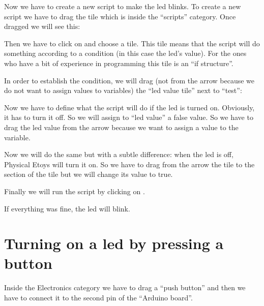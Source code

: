 \documentclass[english]{etoys-guide}
\begin{document}

Now we have to create a new script to make the led blinks. To create a new
script we have to drag the  tile which is inside the
“scripts” category.  Once dragged we will see this:


Then we have to click on  and choose a \testtile{} tile.
This tile means that the script will do something according to a condition (in
this case the led’s value). For the ones who have a bit of experience in
programming this tile is an “if structure”. 


In order to establish the condition, we will drag (not from the arrow because
we do not want to assign values to variables) the “led value tile” next to
“test”:


Now we have to define what the script will do if the led is turned on.
Obviously, it has to turn it off. So we will assign to “led value” a false
value. So we have to drag the led value from the arrow because we want to
assign a value to the variable. 





Now we will do the same but with a subtle difference: when the led is off,
Physical Etoys will turn it on.  So we have to drag from the 
arrow the  tile to the  section of the \testtile{}
tile but we will change its value to true. 


Finally we will run the script by clicking on . 


If everything was fine, the led will blink.

\section{Turning on a led by pressing a button}

Inside the Electronics category we have to drag a “push button” and then we
have to connect it to the second pin of the “Arduino board”.

\end{document}

